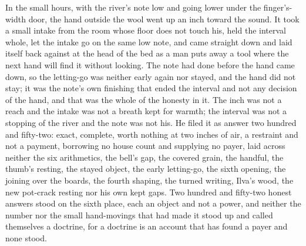 In the small hours, with the river's note low and going lower under the finger's-width door, the hand outside the wool went up an inch toward the sound. It took a small intake from the room whose floor does not touch his, held the interval whole, let the intake go on the same low note, and came straight down and laid itself back against  at the head of the bed as a man puts away a tool where the next hand will find it without looking. The note had done before the hand came down, so the letting-go was neither early again nor stayed, and the hand did not stay; it was the note's own finishing that ended the interval and not any decision of the hand, and that was the whole of the honesty in it. The inch was not a reach and the intake was not a breath kept for warmth; the interval was not a stopping of the river and the note was not his. He filed it as answer two hundred and fifty-two: exact, complete, worth nothing at two inches of air, a restraint and not a payment, borrowing no house count and supplying no payer, laid across neither the six arithmetics, the bell's gap, the covered grain, the handful, the thumb's resting, the stayed object, the early letting-go, the sixth opening, the joining over the boards, the fourth shaping, the turned writing, Ilva's wood, the new pot-crack resting nor his own kept gaps. Two hundred and fifty-two honest answers stood on the sixth place, each an object and not a power, and neither the number nor the small hand-movings that had made it stood up and called themselves a doctrine, for a doctrine is an account that has found a payer and none stood.

